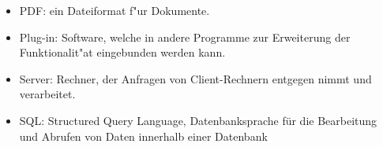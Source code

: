 \begin{itemize}
\item PDF: ein Dateiformat f"ur Dokumente.
\item Plug-in: Software, welche in andere Programme zur Erweiterung der Funktionalit"at eingebunden werden kann.
\item Server:  Rechner, der Anfragen von Client-Rechnern entgegen nimmt und verarbeitet.
\item SQL: Structured Query Language, Datenbanksprache für die Bearbeitung und Abrufen von Daten innerhalb einer Datenbank

\end{itemize}